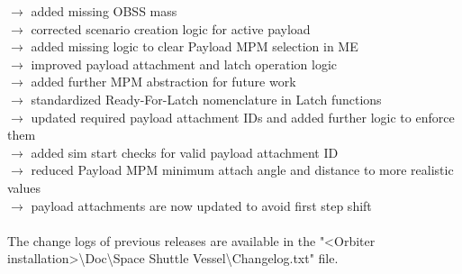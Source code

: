 \documentclass[Space_Shuttle_Vessel_Manual.tex]{subfiles}
\begin{document}
$\rightarrow$ added missing OBSS mass\\
$\rightarrow$ corrected scenario creation logic for active payload\\
$\rightarrow$ added missing logic to clear Payload MPM selection in ME\\
$\rightarrow$ improved payload attachment and latch operation logic\\
$\rightarrow$ added further MPM abstraction for future work\\
$\rightarrow$ standardized Ready-For-Latch nomenclature in Latch functions\\
$\rightarrow$ updated required payload attachment IDs and added further logic to enforce them\\
$\rightarrow$ added sim start checks for valid payload attachment ID\\
$\rightarrow$ reduced Payload MPM minimum attach angle and distance to more realistic values\\
$\rightarrow$ payload attachments are now updated to avoid first step shift
\\
\\
The change logs of previous releases are available in the "<Orbiter installation>\textbackslash Doc\textbackslash Space Shuttle Vessel\textbackslash Changelog.txt" file.
\end{document}
